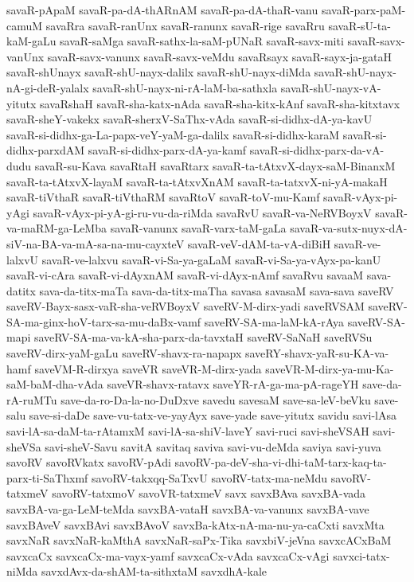 {savaR-pApaM
savaR-pa-dA-thARnAM
savaR-pa-dA-thaR-vanu
savaR-parx-paM-camuM
savaRra
savaR-ranUnx
savaR-ranunx
savaR-rige
savaRru
savaR-sU-ta-kaM-gaLu
savaR-saMga
savaR-sathx-la-saM-pUNaR
savaR-savx-miti
savaR-savx-vanUnx
savaR-savx-vanunx
savaR-savx-veMdu
savaRsayx
savaR-sayx-ja-gataH
savaR-shUnayx
savaR-shU-nayx-dalilx
savaR-shU-nayx-diMda
savaR-shU-nayx-nA-gi-deR-yalalx
savaR-shU-nayx-ni-rA-laM-ba-sathxla
savaR-shU-nayx-vA-yitutx
savaRshaH
savaR-sha-katx-nAda
savaR-sha-kitx-kAnf
savaR-sha-kitxtavx
savaR-sheY-vakekx
savaR-sherxV-SaThx-vAda
savaR-si-didhx-dA-ya-kavU
savaR-si-didhx-ga-La-papx-veY-yaM-ga-dalilx
savaR-si-didhx-karaM
savaR-si-didhx-parxdAM
savaR-si-didhx-parx-dA-ya-kamf
savaR-si-didhx-parx-da-vA-dudu
savaR-su-Kava
savaRtaH
savaRtarx
savaR-ta-tAtxvX-dayx-saM-BinanxM
savaR-ta-tAtxvX-layaM
savaR-ta-tAtxvXnAM
savaR-ta-tatxvX-ni-yA-makaH
savaR-tiVthaR
savaR-tiVthaRM
savaRtoV
savaR-toV-mu-Kamf
savaR-vAyx-pi-yAgi
savaR-vAyx-pi-yA-gi-ru-vu-da-riMda
savaRvU
savaR-va-NeRVBoyxV
savaR-va-maRM-ga-LeMba
savaR-vanunx
savaR-varx-taM-gaLa
savaR-va-sutx-nuyx-dA-siV-na-BA-va-mA-sa-na-mu-cayxteV
savaR-veV-dAM-ta-vA-diBiH
savaR-ve-lalxvU
savaR-ve-lalxvu
savaR-vi-Sa-ya-gaLaM
savaR-vi-Sa-ya-vAyx-pa-kanU
savaR-vi-cAra
savaR-vi-dAyxnAM
savaR-vi-dAyx-nAmf
savaRvu
savaaM
sava-datitx
sava-da-titx-maTa
sava-da-titx-maTha
savasa
savasaM
sava-sava
saveRV
saveRV-Bayx-sasx-vaR-sha-veRVBoyxV
saveRV-M-dirx-yadi
saveRVSAM
saveRV-SA-ma-ginx-hoV-tarx-sa-mu-daBx-vamf
saveRV-SA-ma-laM-kA-rAya
saveRV-SA-mapi
saveRV-SA-ma-va-kA-sha-parx-da-tavxtaH
saveRV-SaNaH
saveRVSu
saveRV-dirx-yaM-gaLu
saveRV-shavx-ra-napapx
saveRY-shavx-yaR-su-KA-va-hamf
saveVM-R-dirxya
saveVR
saveVR-M-dirx-yada
saveVR-M-dirx-ya-mu-Ka-saM-baM-dha-vAda
saveVR-shavx-ratavx
saveYR-rA-ga-ma-pA-rageYH
save-da-rA-ruMTu
save-da-ro-Da-la-no-DuDxve
savedu
savesaM
save-sa-leV-beVku
save-salu
save-si-daDe
save-vu-tatx-ve-yayAyx
save-yade
save-yitutx
savidu
savi-lAsa
savi-lA-sa-daM-ta-rAtamxM
savi-lA-sa-shiV-laveY
savi-ruci
savi-sheVSAH
savi-sheVSa
savi-sheV-Savu
savitA
savitaq
saviva
savi-vu-deMda
saviya
savi-yuva
savoRV
savoRVkatx
savoRV-pAdi
savoRV-pa-deV-sha-vi-dhi-taM-tarx-kaq-ta-parx-ti-SaThxmf
savoRV-takxqq-SaTxvU
savoRV-tatx-ma-neMdu
savoRV-tatxmeV
savoRV-tatxmoV
savoVR-tatxmeV
savx
savxBAva
savxBA-vada
savxBA-va-ga-LeM-teMda
savxBA-vataH
savxBA-va-vanunx
savxBA-vave
savxBAveV
savxBAvi
savxBAvoV
savxBa-kAtx-nA-ma-nu-ya-caCxti
savxMta
savxNaR
savxNaR-kaMthA
savxNaR-saPx-Tika
savxbiV-jeVna
savxcACxBaM
savxcaCx
savxcaCx-ma-vayx-yamf
savxcaCx-vAda
savxcaCx-vAgi
savxci-tatx-niMda
savxdAvx-da-shAM-ta-sithxtaM
savxdhA-kale
}
